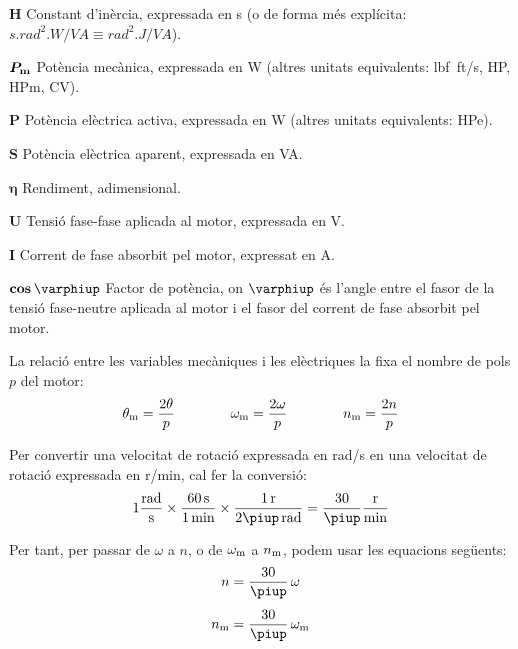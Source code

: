 \begin{list}{}
   \item[$\boldsymbol{H}$] Constant d'inèrcia, expressada en \unit{s} (o de forma més explícita:
   $\unit{s.rad^2.W/VA} \equiv \unit{rad^2.J/VA}$).
   \item[$\boldsymbol{P_\mathrm{m}}$] Potència mecànica, expressada en \unit{W} (altres unitats equivalents: \unit{lbf.ft/s}, \unit{HP},  \unit{HPm}, \unit{CV}).
   \item[$\boldsymbol{P}$] Potència elèctrica activa, expressada en \unit{W} (altres unitats equivalents: \unit{HPe}).
   \item[$\boldsymbol{S}$] Potència elèctrica aparent, expressada en \unit{VA}.
   \item[$\boldsymbol{\eta}$] Rendiment, adimensional.
   \item[$\boldsymbol{U}$] Tensió fase-fase aplicada al motor, expressada en \unit{V}.
   \item[$\boldsymbol{I}$] Corrent de fase absorbit pel motor, expressat en \unit{A}.
   \item[$\boldsymbol{\cos\varphiup}$] Factor de potència, on $\varphiup$ és l'angle entre el fasor de la tensió fase-neutre aplicada al motor i el fasor del corrent de fase absorbit pel motor.
\end{list}

La relació entre les variables mecàniques i les elèctriques la fixa el nombre de pols $p$ del motor:
\begin{equation}\label{eq:vel-ele-mec}
    \theta_\mathrm{m} = \frac{2\theta}{p} \qquad\qquad
    \omega_\mathrm{m} = \frac{2\omega}{p} \qquad\qquad
    n_\mathrm{m} = \frac{2n}{p}
\end{equation}

Per  convertir una velocitat de rotació expressada en \unit{rad/s} en una velocitat de rotació expressada en \unit{r/min}, cal fer la conversió:
\begin{equation}
 1\frac{\unit{rad}}{\unit{s}} \times \frac{\qty{60}{s}}{\qty{1}{min}} \times \frac{\qty{1}{r}}{2\piup\,\unit{rad}} = \frac{30}{\piup}\frac{\unit{r}}{\unit{min}}
 \end{equation}

 Per tant, per passar de $\omega$ a $n$, o de $\omega_\mathrm{m}$ a $n_\mathrm{m}$, podem usar les equacions següents:
\begin{subequations}\index{motors d'inducció!velocitat}
\begin{align}
    n        &= \frac{30}{\piup} \,\omega \\[1ex]
    n\ped{m} &= \frac{30}{\piup} \,\omega\ped{m}
\end{align}
\end{subequations}

